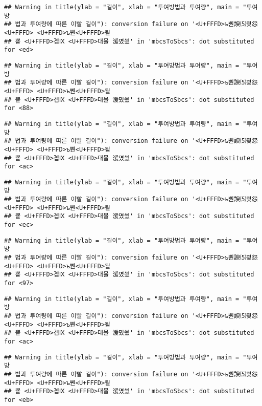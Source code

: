 \documentclass[]{article}
\begin{document}
\begin{verbatim}
## Warning in title(ylab = "길이", xlab = "투여방법과 투여량", main = "투여방
## 법과 투여량에 따른 이빨 길이"): conversion failure on '<U+FFFD>ъ뿬諛⑸쾿怨<U+FFFD> <U+FFFD>ъ뿬<U+FFFD>됱
## 뿉 <U+FFFD>곕Ⅸ <U+FFFD>대묠 湲몄씠' in 'mbcsToSbcs': dot substituted for <ed>
\end{verbatim}

\begin{verbatim}
## Warning in title(ylab = "길이", xlab = "투여방법과 투여량", main = "투여방
## 법과 투여량에 따른 이빨 길이"): conversion failure on '<U+FFFD>ъ뿬諛⑸쾿怨<U+FFFD> <U+FFFD>ъ뿬<U+FFFD>됱
## 뿉 <U+FFFD>곕Ⅸ <U+FFFD>대묠 湲몄씠' in 'mbcsToSbcs': dot substituted for <88>
\end{verbatim}

\begin{verbatim}
## Warning in title(ylab = "길이", xlab = "투여방법과 투여량", main = "투여방
## 법과 투여량에 따른 이빨 길이"): conversion failure on '<U+FFFD>ъ뿬諛⑸쾿怨<U+FFFD> <U+FFFD>ъ뿬<U+FFFD>됱
## 뿉 <U+FFFD>곕Ⅸ <U+FFFD>대묠 湲몄씠' in 'mbcsToSbcs': dot substituted for <ac>
\end{verbatim}

\begin{verbatim}
## Warning in title(ylab = "길이", xlab = "투여방법과 투여량", main = "투여방
## 법과 투여량에 따른 이빨 길이"): conversion failure on '<U+FFFD>ъ뿬諛⑸쾿怨<U+FFFD> <U+FFFD>ъ뿬<U+FFFD>됱
## 뿉 <U+FFFD>곕Ⅸ <U+FFFD>대묠 湲몄씠' in 'mbcsToSbcs': dot substituted for <ec>
\end{verbatim}

\begin{verbatim}
## Warning in title(ylab = "길이", xlab = "투여방법과 투여량", main = "투여방
## 법과 투여량에 따른 이빨 길이"): conversion failure on '<U+FFFD>ъ뿬諛⑸쾿怨<U+FFFD> <U+FFFD>ъ뿬<U+FFFD>됱
## 뿉 <U+FFFD>곕Ⅸ <U+FFFD>대묠 湲몄씠' in 'mbcsToSbcs': dot substituted for <97>
\end{verbatim}

\begin{verbatim}
## Warning in title(ylab = "길이", xlab = "투여방법과 투여량", main = "투여방
## 법과 투여량에 따른 이빨 길이"): conversion failure on '<U+FFFD>ъ뿬諛⑸쾿怨<U+FFFD> <U+FFFD>ъ뿬<U+FFFD>됱
## 뿉 <U+FFFD>곕Ⅸ <U+FFFD>대묠 湲몄씠' in 'mbcsToSbcs': dot substituted for <ac>
\end{verbatim}

\begin{verbatim}
## Warning in title(ylab = "길이", xlab = "투여방법과 투여량", main = "투여방
## 법과 투여량에 따른 이빨 길이"): conversion failure on '<U+FFFD>ъ뿬諛⑸쾿怨<U+FFFD> <U+FFFD>ъ뿬<U+FFFD>됱
## 뿉 <U+FFFD>곕Ⅸ <U+FFFD>대묠 湲몄씠' in 'mbcsToSbcs': dot substituted for <eb>
\end{verbatim}
\end{document}
